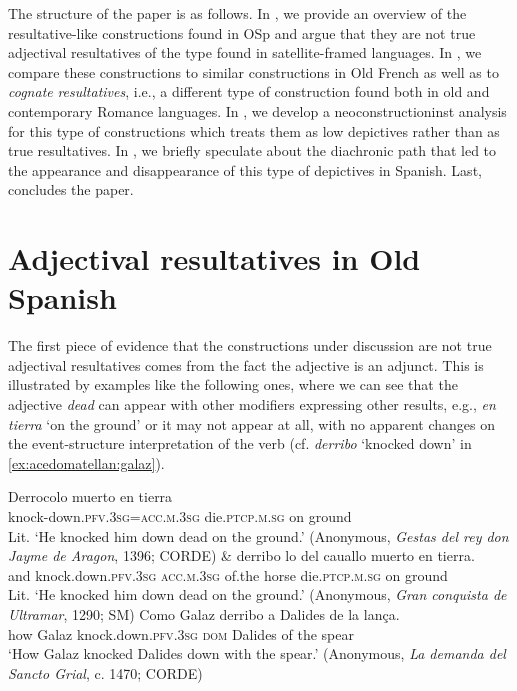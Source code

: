 \documentclass[output=paper,colorlinks,citecolor=brown,
]{langscibook}
\begin{document}
The structure of the paper is as follows. In , we provide an overview of the resultative-like constructions found in OSp and argue that they are not true adjectival resultatives of the type found in satellite-framed languages. In , we compare these constructions to similar constructions in Old French as well as to \textit{cognate} \textit{resultatives}, i.e., a different type of construction found both in old and contemporary Romance languages. In , we develop a neoconstructioninst analysis for this type of constructions which treats them as low depictives rather than as true resultatives. In , we briefly speculate about the diachronic path that led to the appearance and disappearance of this type of depictives in Spanish. Last,  concludes the paper.

\section{Adjectival resultatives in Old Spanish}\label{sec:acedomatellan:2}

The first piece of evidence that the constructions under discussion are not true adjectival resultatives comes from the fact the adjective is an adjunct. This is illustrated by examples like the following ones, where we can see that the adjective \textit{dead} can appear with other modifiers expressing other results, e.g., \textit{en tierra} ‘on the ground’ or it may not appear at all, with no apparent changes on the event-structure interpretation of the verb (cf. \textit{derribo} `knocked down' in \ref{ex:acedomatellan:galaz}).

\ea
  \ea
    \gll Derrocolo muerto en tierra\\
knock-down.\textsc{pfv}.\textsc{3sg}=\textsc{acc}.\textsc{m}.\textsc{3sg} die.\textsc{ptcp}.\textsc{m}.\textsc{sg} on ground\\
    \glt Lit. `He knocked him down dead on the ground.' (Anonymous, \textit{Gestas del rey don Jayme de Aragon}, 1396; CORDE)
  \ex
    \gll \&  derribo lo del cauallo  muerto en tierra. \\
and knock.down.\textsc{pfv}.\textsc{3sg} \textsc{acc.m.3sg}	of.the horse die.\textsc{ptcp}.\textsc{m}.\textsc{sg} on ground		\\
    \glt Lit. `He knocked him down dead on the ground.’ (Anonymous, \textit{Gran conquista de Ultramar}, 1290; SM)
  \ex\label{ex:acedomatellan:galaz}
    \gll Como Galaz derribo a Dalides de la lança. \\
    how Galaz knock.down.\textsc{pfv}.\textsc{3sg} \textsc{dom} Dalides of the spear\\
    \glt `How Galaz knocked Dalides down with the spear.' (Anonymous, \textit{La demanda del Sancto Grial}, c. 1470; CORDE)
  \z 
\z 
\end{document}
